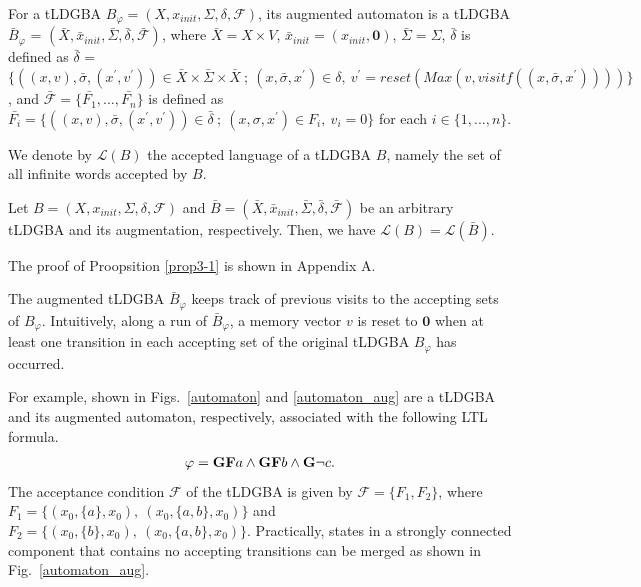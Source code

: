 \begin{definition}
   For a tLDGBA $B_{\varphi} = (X,x_{init},\Sigma,\delta,\mathcal{F})$, its augmented automaton is a tLDGBA $\bar{B}_{\varphi}$ = $(\bar{X},\bar{x}_{init},\bar{\Sigma},\bar{\delta},\bar{\mathcal{F}})$, where $\bar{X} = X\times V$, $\bar{x}_{init} = (x_{init}, \bm{0})$, $\bar{\Sigma} = \Sigma$, $\bar{\delta}$ is defined as $\bar{\delta}$ = $\{ ((x,v), \bar{\sigma}, (x^{\prime},v^{\prime})) \in \bar{X} \times \bar{\Sigma} \times \bar{X}\ ;\ (x,\bar{\sigma},x^{\prime}) \in \delta,\ v^{\prime} = reset(Max(v,visitf((x,\bar{\sigma},x^{\prime})))) \}$, and $\mathcal{\bar{F}} = \{ \bar{F_1}, \ldots ,\bar{F_n} \}$ is defined as $\bar{F_i} = \{ ((x,v), \bar{\sigma}, (x^{\prime},v^{\prime})) \in \bar{\delta}\ ;\ (x, \sigma, x^{\prime}) \in F_i,\ v_i = 0 \}$ for each $ i \in \{1,...,n\}$.
   \label{augment_def}
\end{definition}

We denote by $\mathcal{L}(B)$ the accepted language of a tLDGBA $B$, namely the set of all infinite words accepted by $B$.

\begin{proposition}
  Let $ B = (X,x_{init},\Sigma,\delta,\mathcal{F}) $ and $ \bar{B} = (\bar{X},\bar{x}_{init},\bar{\Sigma},\bar{\delta},\bar{\mathcal{F}}) $ be an arbitrary tLDGBA and its augmentation, respectively.
Then, we have $ \mathcal{L}(B) = \mathcal{L}(\bar{B}) $.
\label{prop3-1}
\end{proposition}
The proof of Proopsition \ref{prop3-1} is shown in Appendix A.

The augmented tLDGBA $\bar{B}_{\varphi}$ keeps track of previous visits to the accepting sets of $B_{\varphi}$.
Intuitively,
along a run of $\bar{B}_\varphi$,
a memory vector $v$ is reset to $\bm{0}$ when at least one transition in each accepting set of the original tLDGBA $B_{\varphi}$ has occurred.

For example, shown in Figs.\ \ref{automaton} and \ref{automaton_aug} are a tLDGBA and its augmented automaton, respectively, associated with the following LTL formula.
\begin{align}
  \varphi = \text{{\bf GF}}a \land \text{{\bf GF}}b \land \text{{\bf G}}\neg c.
  \label{ltl}
\end{align}
The acceptance condition ${\mathcal F}$ of the tLDGBA is given by ${\mathcal F} = \{ F_1,F_2 \}$, where $F_1=\{ (x_0, \{ a \}, x_0),\ (x_0, \{ a,b \}, x_0) \}$ and $F_2 = \{ (x_0, \{ b \}, x_0),\ (x_0, \{ a,b \}, x_0) \}$.
Practically, states in a strongly connected component that contains no accepting transitions can be merged as shown in Fig.\ \ref{automaton_aug}.

